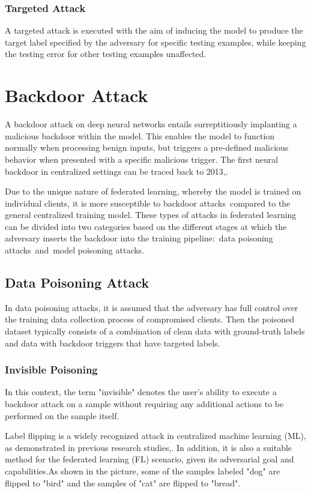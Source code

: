 \documentclass[conference]{IEEEtran}
\begin{document}
\subsubsection{Targeted Attack}A targeted attack is executed with
the aim of inducing the model to produce the target label specified by the
adversary for specific testing examples, while keeping the testing error for
other testing examples unaffected\cite{b51}.

\section{Backdoor Attack}
A backdoor attack on deep neural networks entails surreptitiously implanting
a malicious backdoor within the model. This enables the model to function
normally when processing benign inputs, but triggers a pre-defined
malicious behavior when presented with a specific malicious trigger.
The first neural backdoor in centralized settings can be traced
back to 2013\cite{b52},\cite{b53}.

Due to the unique nature of federated learning, whereby the model is trained
on individual clients, it is more susceptible to backdoor attacks compared
to the general centralized training model. These types of attacks in federated
learning can be divided into two categories based on the different stages at
which the adversary inserts the backdoor into the training pipeline: data
poisoning attacks and model poisoning attacks.

\subsection{Data Poisoning Attack}
In data poisoning attacks, it is assumed that the adversary has full control
over the training data collection process of compromised clients. Then the poisoned
dataset typically consists of a combination of clean data with ground-truth labels
and data with backdoor triggers that have targeted labels.

\subsubsection{Invisible Poisoning}
In this context, the term "invisible" denotes the user's ability to execute
a backdoor attack on a sample without requiring any additional actions to
be performed on the sample itself.

Label flipping is a widely recognized attack in centralized machine learning (ML),
as demonstrated in previous research studies\cite{b54},\cite{b55}. In addition,
it is also a suitable method for the federated learning (FL) scenario,
given its adversarial goal and capabilities\cite{b56}.As shown in the picture,
some of the samples labeled "dog" are flipped to "bird" and the samples of "cat"
are flipped to "bread".
\end{document}
